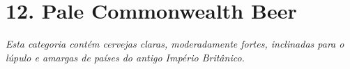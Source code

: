 \section*{12. Pale Commonwealth Beer}
\textit{Esta categoria contém cervejas claras, moderadamente fortes, inclinadas para o lúpulo e amargas de países do antigo Império Britânico.}
